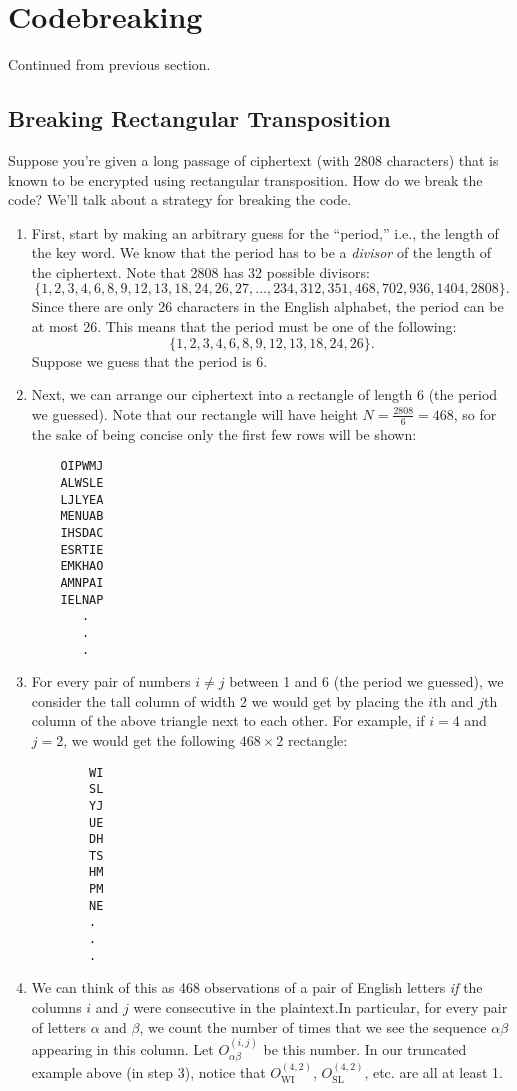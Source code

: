 \documentclass[letterpaper]{article}
\begin{document}
\section{Codebreaking}
Continued from previous section.

\subsection{Breaking Rectangular Transposition}
Suppose you're given a long passage of ciphertext (with 2808 characters) that is known to be encrypted using rectangular transposition. How do we break the code? We'll talk about a strategy for breaking the code. 
\begin{enumerate}
    \item First, start by making an arbitrary guess for the ``period,'' i.e., the length of the key word. We know that the period has to be a \emph{divisor} of the length of the ciphertext. Note that 2808 has 32 possible divisors: 
    \[\{1,2,3,4,6,8,9,12,13,18,24,26,27,\hdots,234,312,351,468,702,936,1404,2808\}.\]
    Since there are only 26 characters in the English alphabet, the period can be at most 26. This means that the period must be one of the following: 
    \[\{1,2,3,4,6,8,9,12,13,18,24,26\}.\]
    Suppose we guess that the period is 6.

    \item Next, we can arrange our ciphertext into a rectangle of length 6 (the period we guessed). Note that our rectangle will have height $N = \frac{2808}{6} = 468$, so for the sake of being concise only the first few rows will be shown: 
    \begin{verbatim}
    OIPWMJ
    ALWSLE
    LJLYEA
    MENUAB
    IHSDAC
    ESRTIE
    EMKHAO
    AMNPAI
    IELNAP
       .
       .
       .\end{verbatim}

    \item For every pair of numbers $i \neq j$ between 1 and 6 (the period we guessed), we consider the tall column of width 2 we would get by placing the $i$th and $j$th column of the above triangle next to each other. For example, if $i = 4$ and $j = 2$, we would get the following $468 \times 2$ rectangle:
    \begin{verbatim}
        WI
        SL
        YJ
        UE
        DH
        TS
        HM
        PM
        NE
        .
        .
        .\end{verbatim}


    \item We can think of this as 468 observations of a pair of English letters \emph{if} the columns $i$ and $j$ were consecutive in the plaintext.In particular, for every pair of letters $\alpha$ and $\beta$, we count the number of times that we see the sequence $\alpha \beta$ appearing in this column. Let $O_{\alpha\beta}^{(i, j)}$ be this number. In our truncated example above (in step 3), notice that $O_{\text{WI}}^{(4, 2)}$, $O_{\text{SL}}^{(4, 2)}$, etc. are all at least 1.
    

\end{enumerate}
\end{document}
